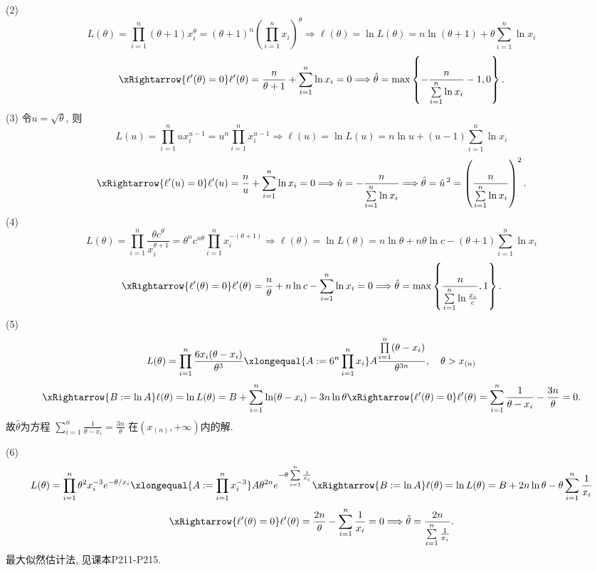 \documentclass[standard]{ExBook}
\renewenvironment{shaded}{%
  \def\FrameCommand{\fboxsep=\FrameSep \colorbox{shadecolor}}%
  \MakeFramed{\advance\hsize-\width \FrameRestore}%
}{%
  \endMakeFramed
}
\begin{document}
\begin{qitems}
(2)
$$
L(\theta)
=\prod_{i=1}^{n}(\theta+1)x_i^{\theta}
=(\theta+1)^n\left(\prod_{i=1}^{n}x_i\right)^{\theta}
\Longrightarrow
\ell(\theta)=\ln L(\theta)
=n\ln(\theta+1)+\theta\sum_{i=1}^{n}\ln x_i
$$
$$
\xRightarrow{\ell'(\theta)=0}
\ell'(\theta)
=\frac{n}{\theta+1}+\sum_{i=1}^{n}\ln x_i=0
\Longrightarrow
\hat{\theta}=\max\left\{-\frac{n}{\sum\limits_{i=1}^{n}\ln x_i}-1, 0\right\}.
$$
(3) 令$u=\sqrt{\theta}$, 则
$$
L(u)
=\prod_{i=1}^{n}u x_i^{u-1}
=u^n\prod_{i=1}^{n}x_i^{u-1}
\Longrightarrow
\ell(u)=\ln L(u)
=n\ln u+(u-1)\sum_{i=1}^{n}\ln x_i
$$
$$
\xRightarrow{\ell'(u)=0}
\ell'(u)=\frac{n}{u}+\sum_{i=1}^{n}\ln x_i=0
\Longrightarrow
\hat{u}=-\frac{n}{\sum\limits_{i=1}^{n}\ln x_i}
\Longrightarrow
\hat{\theta}=\hat{u}^{\,2}
=\left(\frac{n}{\sum\limits_{i=1}^{n}\ln x_i}\right)^2.
$$
(4)
$$
L(\theta)
=\prod_{i=1}^{n}\frac{\theta c^{\theta}}{x_i^{\theta+1}}
=\theta^n c^{n\theta}\prod_{i=1}^{n}x_i^{-(\theta+1)}
\Longrightarrow
\ell(\theta)=\ln L(\theta)
=n\ln\theta+n\theta\ln c-(\theta+1)\sum_{i=1}^{n}\ln x_i
$$
$$
\xRightarrow{\ell'(\theta)=0}
\ell'(\theta)=\frac{n}{\theta}+n\ln c-\sum_{i=1}^{n}\ln x_i=0
\Longrightarrow
\hat{\theta}
=\max\left\{\frac{n}{\sum\limits_{i=1}^{n}\ln\frac{x_i}{c}}, 1\right\}.
$$
(5)
$$
L(\theta)
=\prod_{i=1}^{n}\frac{6x_i(\theta-x_i)}{\theta^3}
\xlongequal{A:=6^n\prod\limits_{i=1}^{n}x_i}
A\frac{\prod\limits_{i=1}^{n}(\theta-x_i)}{\theta^{3n}},
\quad \theta>x_{(n)}
$$
$$
\xRightarrow{B:=\ln A}
\ell(\theta)=\ln L(\theta)
=B+\sum_{i=1}^{n}\ln(\theta-x_i)-3n\ln\theta
\xRightarrow{\ell'(\theta)=0}
\ell'(\theta)
=\sum_{i=1}^{n}\frac{1}{\theta-x_i}-\frac{3n}{\theta}=0.
$$
故$\hat{\theta}$为方程
$
\sum\limits_{i=1}^{n}\frac{1}{\theta-x_i}=\frac{3n}{\theta}
$
在$(x_{(n)},+\infty)$内的解.

(6)
$$
L(\theta)
=\prod_{i=1}^{n}\theta^2x_i^{-3}e^{-\theta/x_i}
\xlongequal{A:=\prod\limits_{i=1}^{n}x_i^{-3}}
A\theta^{2n}e^{-\theta\sum\limits_{i=1}^{n}\frac{1}{x_i}}
\xRightarrow{B:=\ln A}
\ell(\theta)=\ln L(\theta)
=B+2n\ln\theta-\theta\sum_{i=1}^{n}\frac{1}{x_i}
$$
$$
\xRightarrow{\ell'(\theta)=0}
\ell'(\theta)
=\frac{2n}{\theta}-\sum_{i=1}^{n}\frac{1}{x_i}=0
\Longrightarrow
\hat{\theta}
=\frac{2n}{\sum\limits_{i=1}^{n}\frac{1}{x_i}}.
$$
\textcolor{themeColor}{\selectfont {} 最大似然估计法, 见课本P211-P215.}

\vspace{2.5cm-5em}

    \begin{bbox}
    \begin{shaded}
        \qitem


\end{shaded}
\end{bbox}
\end{qitems}
\end{document}
